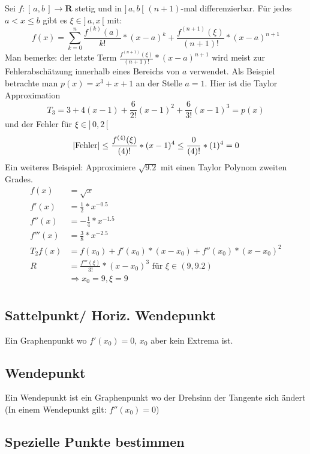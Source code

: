 \documentclass[8pt]{article}
\begin{document}
\begin{multicols*}{3}
Sei $f: [\, a, b\,] \rightarrow \mathbf{R}$ stetig und in $]\, a, b\,[$
$(n+1)$-mal differenzierbar. Für jedes $a < x \leq b$ gibt es $\xi \in ]\,a, x\,[$ mit:
$$
f(x) = \sum_{k = 0}^n \frac{f^{(k)}(a)}{k!} * (x - a)^k + \frac{f^{(n + 1)}(\xi)}{(n + 1)!} * (x - a)^{n + 1}
$$
Man bemerke: der letzte Term $\frac{f^{(n + 1)}(\xi)}{(n + 1)!} * (x - a)^{n + 1}$ wird meist zur Fehlerabschätzung innerhalb eines Bereichs von $a$ verwendet.
Als Beispiel betrachte man $p(x) = x^3 + x + 1$ an der Stelle $a = 1$. Hier ist
die Taylor Approximation $$T_3 = 3 + 4(x - 1) + \frac{6}{2!}(x-1)^2 + \frac{6}{3!}(x-1)^3 = p(x)$$
und der Fehler für $\xi \in ]\,0, 2\,[$
$$
  |\text{Fehler}| \leq \frac{f^{(4)}(\xi)}{(4)!} * (x - 1)^{4} \leq \frac{0}{(4)!} * (1)^{4} = 0\\
$$
Ein weiteres Beispiel: Approximiere $\sqrt{9.2}$ mit einen Taylor Polynom
zweiten Grades.
\begin{align*}
  f(x) &= \sqrt{x}\\
  f'(x) &= \frac{1}{2} * x^{-0.5}\\
  f''(x) &= - \frac{1}{4} * x^{-1.5}\\
  f'''(x) &= \frac{3}{8} * x^{-2.5}\\
  T_2 f(x) &= f(x_0) + f'(x_0) * (x - x_0) + f''(x_0) * (x - x_0)^2\\
  R &= \frac{f'''(\xi)}{3!} * (x - x_0)^3 \text{ für $\xi \in (9, 9.2)$}\\
  &\Rightarrow x_0 = 9, \xi = 9\\
\end{align*}

\subsection{Sattelpunkt/ Horiz. Wendepunkt}

Ein Graphenpunkt wo $f'(x_0) = 0$, $x_0$ aber kein Extrema ist.

\subsection{Wendepunkt}

Ein Wendepunkt ist ein Graphenpunkt wo der Drehsinn der Tangente sich ändert (In einem Wendepunkt gilt: $f''(x_0) = 0$)

\subsection{Spezielle Punkte bestimmen}


\end{multicols*}
\end{document}
